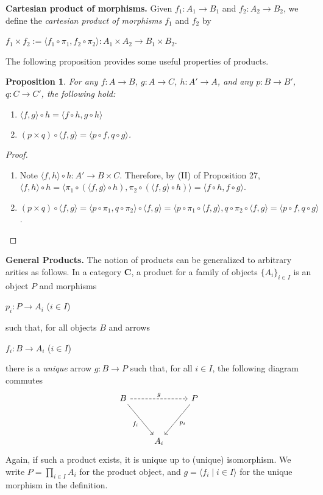 \documentclass[]{amsbook}
\newcommand{\catname}[1]{\mathbf{#1}}
\newcommand{\0}{\mathbf{0}}
\newcommand{\1}{\mathbf{1}}
\newtheorem{prop}{Proposition}
\begin{document}
\textbf{Cartesian product of morphisms.} Given $f_1 : A_1 \to B_1$ and $f_2 :
A_2 \to B_2$, we define the \emph{cartesian product of morphisms} $f_1$ and
$f_2$ by
\begin{center}
    $f_1 \times f_2 := \langle f_1 \circ \pi_1, f_2 \circ \pi_2 \rangle :
    A_1 \times A_2 \to B_1 \times B_2$.
\end{center}

The following proposition provides some useful properties of products.

\begin{prop}
    For any $f: A \to B$, $g: A \to C$, $h: A' \to A$, and any $p: B \to B'$,
    $q: C \to C'$, the following hold:
    \begin{enumerate}
        \item $\langle f, g \rangle \circ h = \langle f \circ h, g \circ h
        \rangle$
        \item $(p \times q) \circ \langle f, g \rangle = \langle p \circ f,
        q \circ g \rangle$.
    \end{enumerate}
\end{prop}
\begin{proof}
\leavevmode
    \begin{enumerate}
        \item Note $\langle f, h \rangle \circ h : A' \to B \times C$.
        Therefore, by (II) of Proposition 27, $\langle f, h \rangle \circ h =
        \langle \pi_1 \circ (\langle f, g \rangle \circ h), \pi_2 \circ
        (\langle f, g \rangle \circ h) \rangle = \langle f \circ h, f \circ g
        \rangle$.
        \item $(p \times q) \circ \langle f, g \rangle = \langle p \circ \pi_1,
        q \circ \pi_2 \rangle \circ \langle f, g \rangle = \langle p \circ
        \pi_1 \circ \langle f, g \rangle, q \circ \pi_2 \circ \langle f, g
        \rangle = \langle p \circ f, q \circ g \rangle$.
    \end{enumerate}
\end{proof}

\textbf{General Products.} The notion of products can be generalized to
arbitrary arities as follows. In a category $\catname{C}$, a product for a
family of objects  $\{ A_i \}_{i \in I}$ is an object $P$ and morphisms
\begin{center}
    $p_i: P \to A_i$ ($i \in I$)
\end{center}
such that, for all objects $B$ and arrows
\begin{center}
    $f_i: B \to A_i$ ($i \in I$)
\end{center}
there is a \emph{unique} arrow $g: B \to P$ such that, for all $i \in I$, the
following diagram commutes
\[
\begin{tikzcd}
    B \arrow[rr, dashrightarrow, "g"] \arrow[ddr, swap, "f_i"]
      & & P \arrow[ddl, "p_i"] \\
    & & \\
    & A_i &
\end{tikzcd}
\]
Again, if such a product exists, it is unique up to (unique) isomorphism. We
write $P = \prod_{i \in I} A_i$ for the product object, and $g = \langle f_i
\mid i \in I \rangle$ for the unique morphism in the definition.
\end{document}
